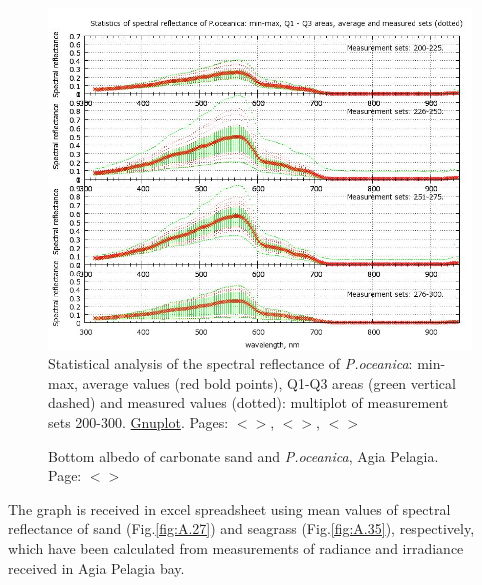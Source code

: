 \documentclass[11pt]{article}
\begin{document}
\begin{figure}[H]
	\centering
	\includegraphics[scale=0.40]{GNU-19.jpg}
	\caption{Statistical analysis of the spectral reflectance of \textit{P.oceanica}: min-max, average values (red bold points), Q1-Q3 areas (green vertical dashed) and 	measured values (dotted): multiplot of measurement sets 200-300. \href{http://www.gnuplot.info/}{Gnuplot}. Pages: $<$\pageref{page-21}$>$, $<$\pageref{page-28}$>$, $<$\pageref{page-37}$>$}
	\label{fig:4.10}
\end{figure}
\begin{figure}[H]
	\centering
	\caption{Bottom albedo of carbonate sand and \textit{P.oceanica}, Agia Pelagia. Page: $<$\pageref{page-22}$>$}
	\label{fig:4.11}
\end{figure}
The graph is received in excel spreadsheet using mean values of spectral reflectance of
sand (Fig.\ref{fig:A.27}) and seagrass (Fig.\ref{fig:A.35}), respectively, which have been calculated from measurements of radiance and
irradiance received in Agia Pelagia bay.
\end{document}
